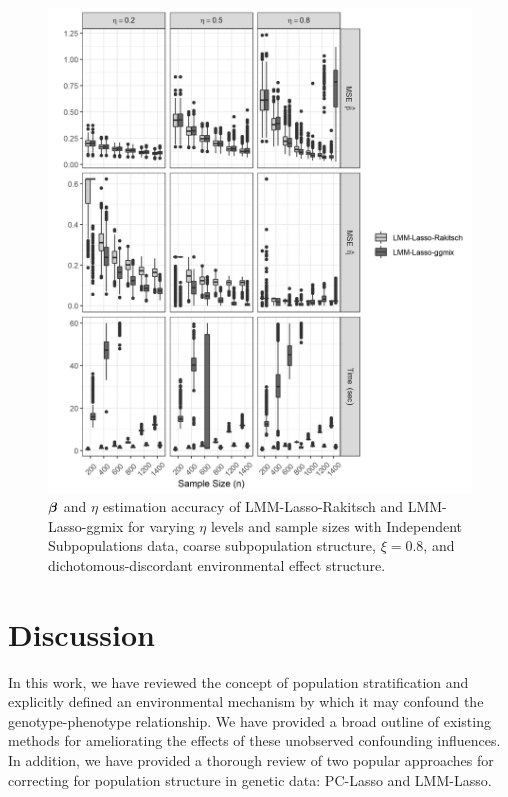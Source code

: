 \begin{figure}[H]
    \centering
    \includegraphics[scale = 1]{figures/eta_beta_hat.png}
     \caption{$\boldsymbol{\beta}{}$ and $\eta$ estimation accuracy of LMM-Lasso-Rakitsch and LMM-Lasso-ggmix for varying $\eta$ levels and sample sizes with Independent Subpopulations data, coarse subpopulation structure, $\xi = 0.8$, and dichotomous-discordant environmental effect structure.}
    \label{fig:eta_beta_mse}
\end{figure}

\section{Discussion} \label{sec:discussion}

In this work, we have reviewed the concept of population stratification and explicitly defined an environmental mechanism by which it may confound the genotype-phenotype relationship. We have provided a broad outline of existing methods for ameliorating the effects of these unobserved confounding influences. In addition, we have provided a thorough review of two popular approaches for correcting for population structure in genetic data: PC-Lasso and LMM-Lasso. 


